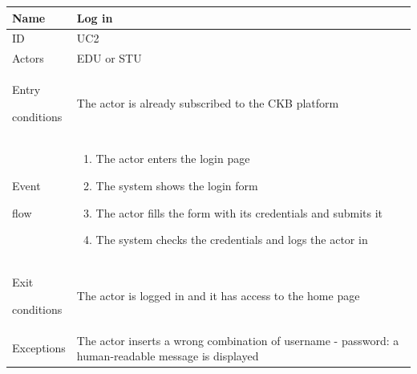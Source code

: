 \begin{center}
    \def\arraystretch{1.5}
    \begin{tabular}{| m{2cm} | m{10cm}|}
        \hline
        Name                  & Log in                                                                                              \\ \hline
        ID                    & UC2                                                                                                 \\ \hline
        Actors                & EDU or STU                                                                                          \\ \hline
        Entry \par conditions & The actor is already subscribed to the CKB platform                                                 \\ \hline
        Event \par flow       & \begin{enumerate}
                                    \item The actor enters the login page
                                    \item The system shows the login form
                                    \item The actor fills the form with its credentials and submits it
                                    \item The system checks the credentials and logs the actor in
                                \end{enumerate}                                   \\ \hline
        Exit \par conditions  & The actor is logged in and it has access to the home page                                           \\ \hline
        Exceptions            & The actor inserts a wrong combination of username - password: a human-readable message is displayed \\ \hline
    \end{tabular}
\end{center}
